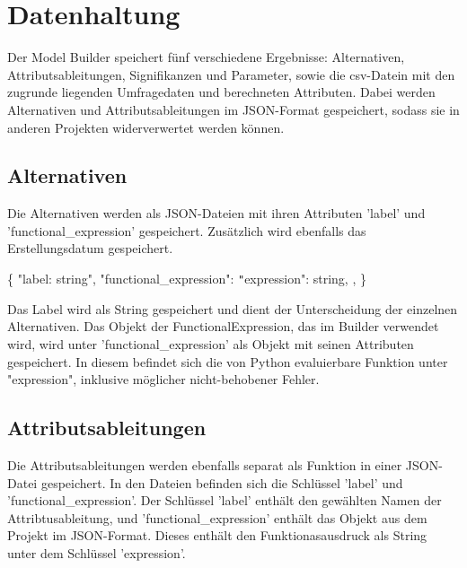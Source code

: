 \documentclass{article}
\begin{document}
\section{Datenhaltung}

Der Model Builder speichert fünf verschiedene Ergebnisse: Alternativen, Attributsableitungen, Signifikanzen und Parameter, sowie die csv-Datein mit den zugrunde liegenden Umfragedaten und berechneten Attributen. Dabei werden Alternativen und Attributsableitungen im JSON-Format gespeichert, sodass sie in anderen Projekten widerverwertet werden können.

\subsection{Alternativen}
Die Alternativen werden als JSON-Dateien mit ihren Attributen 'label' und 'functional\_expression' gespeichert. Zusätzlich wird ebenfalls das Erstellungsdatum gespeichert.

\newline
\{ \newline
    "label: string", \newline
    "functional\_expression": {\newline
        \texttt{"}expression": string, \newline
    }, \newline
\} \newline
\newline

Das Label wird als String gespeichert und dient der Unterscheidung der einzelnen Alternativen. Das Objekt der FunctionalExpression, das im Builder verwendet wird, wird unter 'functional\_expression' als Objekt mit seinen Attributen gespeichert. In diesem befindet sich die von Python evaluierbare Funktion unter "expression", inklusive möglicher nicht-behobener Fehler.

\subsection{Attributsableitungen}
Die Attributsableitungen werden ebenfalls separat als Funktion in einer JSON-Datei gespeichert. In den Dateien befinden sich die Schlüssel 'label' und 'functional\_expression'. Der Schlüssel 'label' enthält den gewählten Namen der Attribtusableitung, und 'functional\_expression' enthält das Objekt aus dem Projekt im JSON-Format. Dieses enthält den Funktionasausdruck als String unter dem Schlüssel 'expression'.
\end{document}
